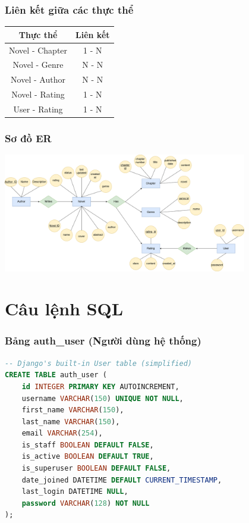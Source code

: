 \documentclass[12pt,aspectratio=169,handout]{beamer}
\begin{document}
\begin{frame}
	\frametitle{Liên kết giữa các thực thể}
	\begin{center}
		\begin{tabular}{|c|c|}
			\hline
			\textbf{Thực thể} & \textbf{Liên kết} \\
			\hline
			Novel - Chapter & 1 - N \\
			Novel - Genre & N - N \\
			Novel - Author & N - N \\
			Novel - Rating & 1 - N \\
			User - Rating & 1 - N \\
			\hline
		\end{tabular}
	\end{center}
\end{frame}


\begin{frame}
    \frametitle{Sơ đồ ER}
    \begin{center}
        \includegraphics[width=0.8\textwidth]{img/ER.png}
    \end{center}
\end{frame}

\section{Câu lệnh SQL}

\begin{frame}[fragile]
\frametitle{Bảng auth\_user (Người dùng hệ thống)}
\begin{lstlisting}[language=SQL, basicstyle=\small\ttfamily]
-- Django's built-in User table (simplified)
CREATE TABLE auth_user (
    id INTEGER PRIMARY KEY AUTOINCREMENT,
    username VARCHAR(150) UNIQUE NOT NULL,
    first_name VARCHAR(150),
    last_name VARCHAR(150),
    email VARCHAR(254),
    is_staff BOOLEAN DEFAULT FALSE,
    is_active BOOLEAN DEFAULT TRUE,
    is_superuser BOOLEAN DEFAULT FALSE,
    date_joined DATETIME DEFAULT CURRENT_TIMESTAMP,
    last_login DATETIME NULL,
    password VARCHAR(128) NOT NULL
);
\end{lstlisting}
\end{frame}
\end{document}
